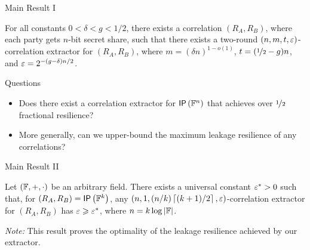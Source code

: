 \begin{frame}{Main Result I}
	\begin{theorem}
	\label{thm:construction}
	For all constants $0<\delta<g<1/2$, there exists a correlation $(R_A,R_B)$, where each party gets $n$-bit secret share, such that there exists a two-round $(n,m,t,\varepsilon)$-correlation extractor for $(R_A,R_B)$, where $m=(\delta n)^{1-o(1)}$, $t=(\nicefrac12-g)n$, and $\varepsilon=2^{-(g-\delta)n/2}$. 
	\end{theorem}
	\pause
	{
	\begin{block}{Questions}
		\begin{itemize}
		\item Does there exist a correlation extractor for $ \IP[\bbF^n] $ that achieves over $ \nicefrac{1}{2} $ fractional resilience? \pause
		\item More generally, can we upper-bound the maximum leakage resilience of any correlations? 
		\end{itemize}
	\end{block}
	}
\end{frame}

\begin{frame}{Main Result II}
	\begin{theorem}
	\label{thm:hardness} 
	Let $({\mathbb F},+,\cdot)$ be an arbitrary field. 
	There exists a universal constant $\varepsilon^*>0$ such that, for $(R_A,R_B)=\IP [\bbF^k] $, %
	any $(n,1,(n/k)\left\lceil{(k+1)/2}\right\rceil,\varepsilon)$-correlation extractor for $(R_A,R_B)$ has $\varepsilon\geqslant\varepsilon^*$, where $n=k\log\left\vert{\ensuremath{{\mathbb F}}}\right\vert$.  
\end{theorem}

\textit{Note:} This result proves the optimality of the leakage resilience achieved by our extractor.
\end{frame}